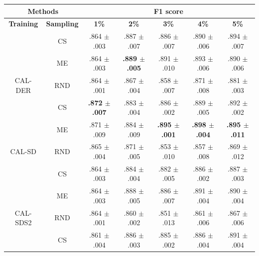 \begin{table}[htbp]
\centering

\begin{tabular*}{\linewidth}{c|c|@{\extracolsep{\fill}}ccccc}
\toprule
\multicolumn{2}{c|}{\textbf{Methods}} & \multicolumn{5}{c}{\textbf{F1 score}} \\
\midrule
\textbf{Training} & \textbf{Sampling} & \textbf{1\%} & \textbf{2\%} & \textbf{3\%} & \textbf{4\%} & \textbf{5\%}\\
\midrule
 & CS & .864 $\pm$ {\small .003} & .887 $\pm$ {\small .007} & .886 $\pm$ {\small .007} & .890 $\pm$ {\small .006} & .894 $\pm$ {\small .007}\\

 & ME & .864 $\pm$ {\small .003} & \textbf{.889 $\pm$ {\small .005}} & .891 $\pm$ {\small .010} & .893 $\pm$ {\small .006} & .890 $\pm$ {\small .006}\\

\multirow{-3}{*}{\raggedright\arraybackslash CAL-DER} & RND & .864 $\pm$ {\small .001} & .867 $\pm$ {\small .004} & .858 $\pm$ {\small .007} & .871 $\pm$ {\small .008} & .881 $\pm$ {\small .003}\\
\midrule
 & CS & \textbf{.872 $\pm$ {\small .007}} & .883 $\pm$ {\small .004} & .886 $\pm$ {\small .002} & .889 $\pm$ {\small .005} & .892 $\pm$ {\small .002}\\

 & ME & .871 $\pm$ {\small .009} & .884 $\pm$ {\small .009} & \textbf{.895 $\pm$ {\small .001}} & \textbf{.898 $\pm$ {\small .004}} & \textbf{.895 $\pm$ {\small .011}}\\

\multirow{-3}{*}{\raggedright\arraybackslash CAL-SD} & RND & .865 $\pm$ {\small .004} & .871 $\pm$ {\small .005} & .853 $\pm$ {\small .010} & .857 $\pm$ {\small .008} & .869 $\pm$ {\small .012}\\
\midrule
 & CS & .864 $\pm$ {\small .003} & .884 $\pm$ {\small .004} & .882 $\pm$ {\small .005} & .886 $\pm$ {\small .002} & .887 $\pm$ {\small .003}\\

 & ME & .864 $\pm$ {\small .003} & .888 $\pm$ {\small .005} & .886 $\pm$ {\small .007} & .891 $\pm$ {\small .004} & .890 $\pm$ {\small .004}\\

\multirow{-3}{*}{\raggedright\arraybackslash CAL-SDS2} & RND & .864 $\pm$ {\small .001} & .860 $\pm$ {\small .002} & .851 $\pm$ {\small .013} & .861 $\pm$ {\small .006} & .867 $\pm$ {\small .006}\\
\midrule
 & CS & .861 $\pm$ {\small .004} & .886 $\pm$ {\small .003} & .885 $\pm$ {\small .002} & .886 $\pm$ {\small .004} & .891 $\pm$ {\small .004}\\


\end{tabular*}
\end{table}
